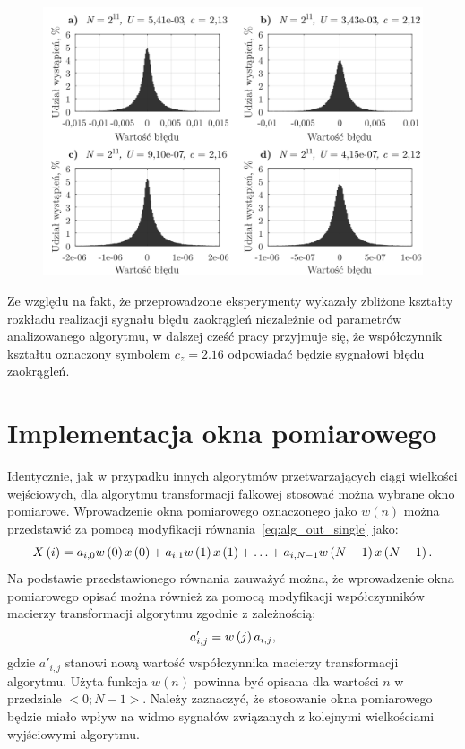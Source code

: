 \begin{figure}[htb!]
\begin{center}
\includegraphics{obrazki/hist_numerr_coif5}
\end{center}
\end{figure}

Ze względu na fakt, że przeprowadzone eksperymenty wykazały zbliżone kształty rozkładu realizacji sygnału błędu zaokrągleń niezależnie od parametrów analizowanego algorytmu, w dalszej cześć pracy przyjmuje się, że współczynnik kształtu oznaczony symbolem $c_{z} = \num{2.16}$ odpowiadać będzie sygnałowi błędu zaokrągleń.

\section{Implementacja okna pomiarowego}

Identycznie, jak w przypadku innych algorytmów przetwarzających ciągi wielkości wejściowych, dla algorytmu transformacji falkowej stosować można wybrane okno pomiarowe. Wprowadzenie okna pomiarowego oznaczonego jako $w(n)$ można przedstawić za pomocą modyfikacji równania~\eqref{eq:alg_out_single} jako:
\begin{equation}
X \left(i\right) = a_{i, 0} w \left(0\right) x \left(0\right) + a_{i, 1} w \left(1\right) x \left(1\right) + \hdots + a_{i, N-1} w \left(N-1\right) x \left(N-1\right) \label{eq:wt_singlewindow}.
\end{equation}
Na podstawie przedstawionego równania zauważyć można, że wprowadzenie okna pomiarowego opisać można również za pomocą modyfikacji współczynników macierzy transformacji algorytmu zgodnie z zależnością:
\begin{equation}
a'_{i,j} = w \left(j\right) a_{i,j} \label{eq:wt_windowmod},
\end{equation}
gdzie $a'_{i,j}$ stanowi nową wartość współczynnika macierzy transformacji algorytmu. Użyta funkcja $w(n)$ powinna być opisana dla wartości $n$ w przedziale $<0;N-1>$. Należy zaznaczyć, że stosowanie okna pomiarowego będzie miało wpływ na widmo sygnałów związanych z kolejnymi wielkościami wyjściowymi algorytmu.

